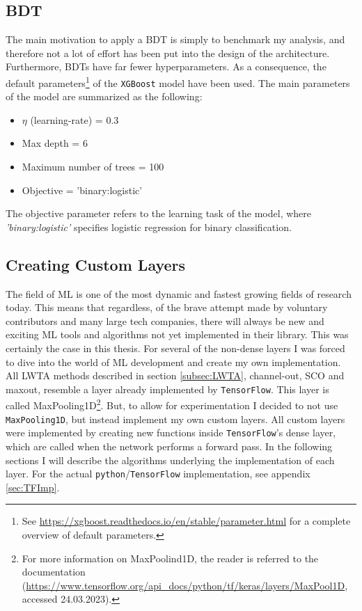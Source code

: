 \subsection*{BDT}\label{subsec:XGBoost}
The main motivation to apply a \ac{BDT} is simply to benchmark my analysis, and therefore not a lot of effort has been put into the design of the 
architecture. Furthermore, \ac{BDT}s have far fewer hyperparameters. As a consequence, the default parameters\footnote{See \url{https://xgboost.readthedocs.io/en/stable/parameter.html}
for a complete overview of default parameters.} of the \verb!XGBoost! model have been used. 
The main parameters of the model are summarized as the following:
\begin{itemize}
    \item $\eta$ (learning-rate) = 0.3
    \item Max depth = 6
    \item Maximum number of trees = 100
    \item Objective = 'binary:logistic'
\end{itemize}
The objective parameter refers to the learning task of the model, where \emph{'binary:logistic'} specifies logistic regression for binary classification.

\subsection{Creating Custom Layers}\label{subsec:CustomLayer}
The field of \ac{ML} is one of the most dynamic and fastest growing fields of research
today. This means that regardless, of the brave attempt made by voluntary contributors and many large tech companies,
there will always be new and exciting \ac{ML} tools and algorithms not yet implemented in their library. This was 
certainly the case in this thesis. For several of the non-dense layers I was forced
to dive into the world of \ac{ML} development and create my own implementation. 
\\
All \ac{LWTA} methods described in section \ref{subsec:LWTA}, channel-out, 
\ac{SCO} and maxout, resemble a layer already implemented by \verb!TensorFlow!. This layer is called 
MaxPooling1D\footnote{For more information on MaxPoolind1D, the reader is referred to the documentation 
(\url{https://www.tensorflow.org/api_docs/python/tf/keras/layers/MaxPool1D},
accessed 24.03.2023).}. But, to allow for experimentation I decided to not use \verb!MaxPooling1D!, but instead 
implement my own custom layers. All custom layers were implemented by creating new functions inside 
\verb!TensorFlow!'s dense layer, which are called when the network performs a forward pass. In the following sections 
I will describe the algorithms underlying the implementation of each layer. For the actual \verb!python!/\verb!TensorFlow! implementation,
see appendix \ref{sec:TFImp}.
